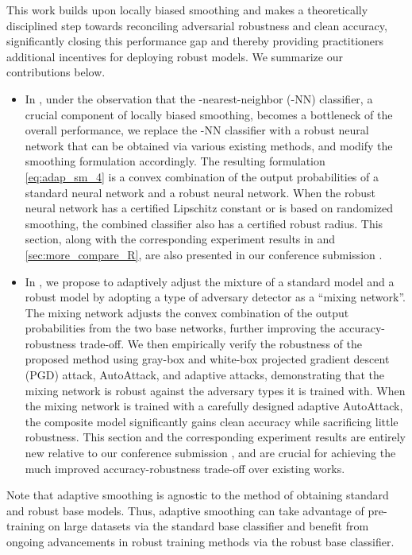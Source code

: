 \documentclass[11pt, letterpaper]{article}
\theoremstyle{plain}
\theoremstyle{definition}
\begin{document}
This work builds upon locally biased smoothing \citep{Anderson21b} and makes a theoretically disciplined step towards reconciling adversarial robustness and clean accuracy, significantly closing this performance gap and thereby providing practitioners additional incentives for deploying robust models. We summarize our contributions below.
\begin{itemize}[leftmargin=6mm]
	\setlength\itemsep{1pt}
	\item In , under the observation that the -nearest-neighbor (-NN) classifier, a crucial component of locally biased smoothing, becomes a bottleneck of the overall performance, we replace the -NN classifier with a robust neural network that can be obtained via various existing methods, and modify the smoothing formulation accordingly. The resulting formulation \cref{eq:adap_sm_4} is a convex combination of the output probabilities of a standard neural network and a robust neural network. When the robust neural network has a certified Lipschitz constant or is based on randomized smoothing, the combined classifier also has a certified robust radius. This section, along with the corresponding experiment results in  and \ref{sec:more_compare_R}, are also presented in our conference submission \citep{Bai23a}.
	\item In , we propose to adaptively adjust the mixture of a standard model and a robust model by adopting a type of adversary detector as a ``mixing network''. The mixing network adjusts the convex combination of the output probabilities from the two base networks, further improving the accuracy-robustness trade-off. We then empirically verify the robustness of the proposed method using gray-box and white-box projected gradient descent (PGD) attack, AutoAttack, and adaptive attacks, demonstrating that the mixing network is robust against the adversary types it is trained with. When the mixing network is trained with a carefully designed adaptive AutoAttack, the composite model significantly gains clean accuracy while sacrificing little robustness. This section and the corresponding experiment results are entirely new relative to our conference submission \citep{Bai23a}, and are crucial for achieving the much improved accuracy-robustness trade-off over existing works.
\end{itemize}

Note that adaptive smoothing is agnostic to the method of obtaining standard and robust base models. Thus, adaptive smoothing can take advantage of pre-training on large datasets via the standard base classifier and benefit from ongoing advancements in robust training methods via the robust base classifier.
\end{document}
